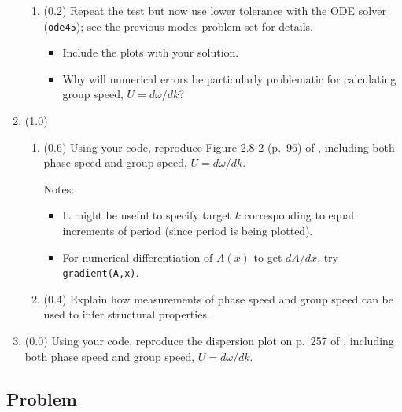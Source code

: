 \documentclass[11pt,titlepage,fleqn]{article}
\begin{document}
\begin{enumerate}
\begin{enumerate}
\item (0.2) Repeat the test but now use lower tolerance with the ODE solver (\verb+ode45+); see the previous modes problem set for details.
%
\begin{itemize}
\item Include the plots with your solution.
\item Why will numerical errors be particularly problematic for calculating group speed, $U = d\omega/dk$?
\end{itemize}

\end{enumerate}


\item (1.0)
%
\begin{enumerate}
\item (0.6) Using your code, reproduce Figure 2.8-2 (p.~96) of \citet{SteinWysession}, including both phase speed and group speed, $U = d\omega/dk$.

Notes:
%
\begin{itemize}
\item It might be useful to specify target $k$ corresponding to equal increments of period (since period is being plotted).
\item For numerical differentiation of $A(x)$ to get $dA/dx$, try \verb+gradient(A,x)+.
\end{itemize}

\item (0.4) Explain how measurements of phase speed and group speed can be used to infer structural properties.
\end{enumerate}


\item (0.0) Using your code, reproduce the dispersion plot on p.~257 of \citet{AkiRichardsE2}, including both phase speed and group speed, $U = d\omega/dk$.


\end{enumerate}


\subsection*{Problem} \howmuchtime\



\end{document}
